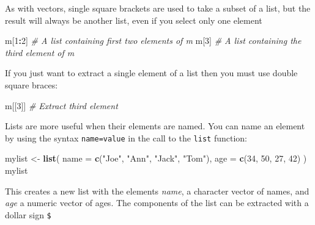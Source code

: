 \documentclass[
]{book}
\newenvironment{Shaded}{\begin{snugshade}}{\end{snugshade}}
\newcommand{\AttributeTok}[1]{\textcolor[rgb]{0.13,0.29,0.53}{#1}}
\newcommand{\CommentTok}[1]{\textcolor[rgb]{0.56,0.35,0.01}{\textit{#1}}}
\newcommand{\DecValTok}[1]{\textcolor[rgb]{0.00,0.00,0.81}{#1}}
\newcommand{\FunctionTok}[1]{\textcolor[rgb]{0.13,0.29,0.53}{\textbf{#1}}}
\newcommand{\NormalTok}[1]{#1}
\newcommand{\OtherTok}[1]{\textcolor[rgb]{0.56,0.35,0.01}{#1}}
\newcommand{\SpecialCharTok}[1]{\textcolor[rgb]{0.81,0.36,0.00}{\textbf{#1}}}
\newcommand{\StringTok}[1]{\textcolor[rgb]{0.31,0.60,0.02}{#1}}
\begin{document}
As with vectors, single square brackets are used to take a subset of a
list, but the result will always be another list, even if you select
only one element

\begin{Shaded}
\begin{Highlighting}[]
\NormalTok{m[}\DecValTok{1}\SpecialCharTok{:}\DecValTok{2}\NormalTok{] }\CommentTok{\# A list containing first two elements of m}
\NormalTok{m[}\DecValTok{3}\NormalTok{] }\CommentTok{\# A list containing the third element of m}
\end{Highlighting}
\end{Shaded}

If you just want to extract a single element of a list then you must use
double square braces:

\begin{Shaded}
\begin{Highlighting}[]
\NormalTok{m[[}\DecValTok{3}\NormalTok{]] }\CommentTok{\# Extract third element}
\end{Highlighting}
\end{Shaded}

Lists are more useful when their elements are named. You can name an element
by using the syntax \texttt{name=value} in the call to the \texttt{list} function:

\begin{Shaded}
\begin{Highlighting}[]
\NormalTok{mylist }\OtherTok{\textless{}{-}} \FunctionTok{list}\NormalTok{(}
  \AttributeTok{name =} \FunctionTok{c}\NormalTok{(}\StringTok{"Joe"}\NormalTok{, }\StringTok{"Ann"}\NormalTok{, }\StringTok{"Jack"}\NormalTok{, }\StringTok{"Tom"}\NormalTok{),}
  \AttributeTok{age =} \FunctionTok{c}\NormalTok{(}\DecValTok{34}\NormalTok{, }\DecValTok{50}\NormalTok{, }\DecValTok{27}\NormalTok{, }\DecValTok{42}\NormalTok{)}
\NormalTok{)}
\NormalTok{mylist}
\end{Highlighting}
\end{Shaded}

This creates a new list with the elements \emph{name}, a character
vector of names, and \emph{age} a numeric vector of ages. The components
of the list can be extracted with a dollar sign \texttt{\$}

\begin{Shaded}
\end{Shaded}
\end{document}
